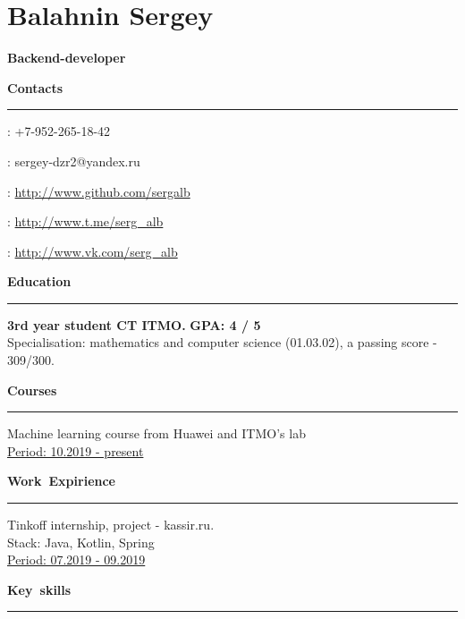 \documentclass[12pt, a4paper]{report}
\author{Балахнин Сергей}
\begin{document}
    \section*{Balahnin Sergey}

    {\large\textbf{Backend-developer}}

    \hbox{\large\textbf{Contacts}}\kern5pt\hrule\kern5pt

    \faPhone: +7-952-265-18-42

    \Letter: sergey-dzr2@yandex.ru

    \faGithub: \url{http://www.github.com/sergalb}

    \faSend: \url{http://www.t.me/serg_alb}

    \faVk: \url{http://www.vk.com/serg_alb} \\



    \par\hbox{\large\textbf{Education}}\kern5pt\hrule\kern5pt

    \textbf{3rd year student CT ITMO.}
    \hfill
    \textbf{ GPA: 4 / 5} \\
        Specialisation: mathematics and computer science (01.03.02), a passing score - 309/300.\\

    \par\hbox{\large\textbf{Courses}}\kern5pt\hrule\kern5pt
    Machine learning course from Huawei and ITMO's lab \\
    \underline{Period: 10.2019 - present} \\


    \par\hbox{\large\textbf{Work Expirience}}\kern3pt\hrule\kern10pt

    Tinkoff internship, project - kassir.ru. \\
    Stack: Java, Kotlin, Spring \\
    \underline{Period: 07.2019 - 09.2019} \\


    \par\hbox{\large\textbf{Key skills}}\kern5pt\hrule\kern5pt
\end{document}
